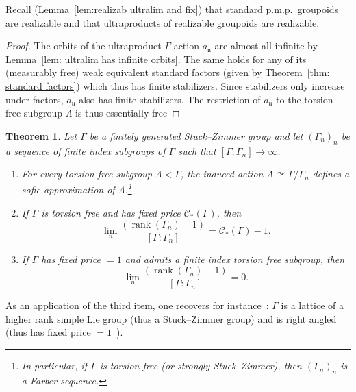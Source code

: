 \documentclass[10pt]{amsart}
\newtheorem{theo}[cdrthm]{Theorem}
\theoremstyle{definition}
\newcommand{\acting}{\curvearrowright}
\newcommand{\vraicost}{\mathscr{C}}
\DeclareMathOperator{\rank}{rank}
\newcommand{\ul}{\mathfrak{u}}
\newcommand{\pmp}{p.m.p.\ }
\begin{document}
Recall (Lemma~\ref{lem:realizab ultralim and fix}) that standard \pmp groupoids are realizable and that ultraproducts of realizable groupoids are realizable.


\begin{proof}
The orbits of the ultraproduct $\Gamma$-action $a_{\ul}$ are almost all infinite by Lemma~\ref{lem: ultralim has infinite orbits}. The same holds for any of its (measurably free) weak equivalent standard factors (given by Theorem~\ref{thm: standard factors}) which thus has finite stabilizers. Since stabilizers only increase under factors, $a_{\ul}$ also has finite stabilizers. The restriction of $a_{\ul}$ to the torsion free subgroup $\Lambda$ is thus essentially free
\end{proof}


\begin{theo}\label{th: Stuck-Zimmer gps and seq f i subgroups}
Let $\Gamma$ be a finitely generated Stuck--Zimmer group and let $(\Gamma_n)_n$ be a sequence of finite index subgroups of $\Gamma$ such that $[\Gamma:\Gamma_n]\to \infty$.
\begin{enumerate}
\item\label{it: torsion free subg and sofic approx}
For every torsion free subgroup $\Lambda<\Gamma$, the induced action $\Lambda\acting \Gamma/\Gamma_n$ defines a sofic approximation of $\Lambda$.\footnote{In particular, if $\Gamma$ is torsion-free (or strongly Stuck--Zimmer), then $(\Gamma_n)_n$ is a Farber sequence.}
\item\label{it: rk grad vs fixed price}
If $\Gamma$ is torsion free and has fixed price $\vraicost_*(\Gamma)$, then
\begin{equation}
\lim_{n}
\frac{\left(\rank (\Gamma_n)-1\right)}{ [\Gamma:\Gamma_n]}=\vraicost_*(\Gamma)-1.
\end{equation}

\item\label{theo4.14.3} If $\Gamma$ has fixed price $=1$ and admits a finite index torsion free subgroup, then
\begin{equation}
\lim_{n} \frac{\left(
\rank (\Gamma_n)-1\right)}{ [\Gamma:\Gamma_n]}=0.
\end{equation}
\end{enumerate}
\end{theo}

As an application of the third item, one recovers for instance~\cite[Theorem~2]{Abert-Nikolov-Gelander}: $\Gamma$ is a lattice of a higher rank simple Lie group (thus a Stuck--Zimmer group) and is right angled (thus has fixed price $=1$~\cite{Gab-cost}).
\end{document}
